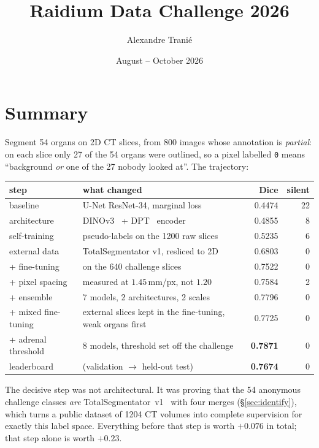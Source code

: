 \documentclass{article}
\title{Raidium Data Challenge 2026}
\author{Alexandre Tranié}
\date{August -- October 2026}
\begin{document}
\maketitle
\tableofcontents
\newpage

\section*{Summary}

Segment 54 organs on 2D CT slices, from 800 images whose annotation is
\emph{partial}: on each slice only 27 of the 54 organs were outlined, so a pixel
labelled \texttt{0} means ``background \emph{or} one of the 27 nobody looked
at''. The trajectory:

\begin{center}
\begin{tabularx}{\textwidth}{@{}lXrr@{}}
\hline
\textbf{step} & \textbf{what changed} & \textbf{Dice} & \textbf{silent} \\
\hline
baseline        & U-Net ResNet-34, marginal loss            & 0.4474 & 22 \\
architecture    & DINOv3~\cite{dinov3} + DPT~\cite{dpt} encoder      & 0.4855 & 8 \\
self-training   & pseudo-labels on the 1200 raw slices      & 0.5235 & 6 \\
external data   & TotalSegmentator v1, resliced to 2D       & 0.6803 & 0 \\
+ fine-tuning   & on the 640 challenge slices               & 0.7522 & 0 \\
+ pixel spacing & measured at $1.45$\,mm/px, not $1.20$     & 0.7584 & 2 \\
+ ensemble      & 7 models, 2 architectures, 2 scales       & 0.7796 & 0 \\
+ mixed fine-tuning & external slices kept in the fine-tuning, weak organs first & 0.7725 & 0 \\
+ adrenal threshold & 8 models, threshold set off the challenge & \textbf{0.7871} & 0 \\
\hline
leaderboard     & (validation $\to$ held-out test)          & \textbf{0.7674} & 0 \\
\hline
\end{tabularx}
\end{center}

\noindent The decisive step was not architectural. It was proving that the 54
anonymous challenge classes \emph{are} TotalSegmentator~v1~\cite{totalseg} with
four merges (\S\ref{sec:identify}), which turns a public dataset of 1204 CT volumes
into complete supervision for exactly this label space. Everything before that
step is worth $+0.076$ in total; that step alone is worth $+0.23$.
\end{document}
